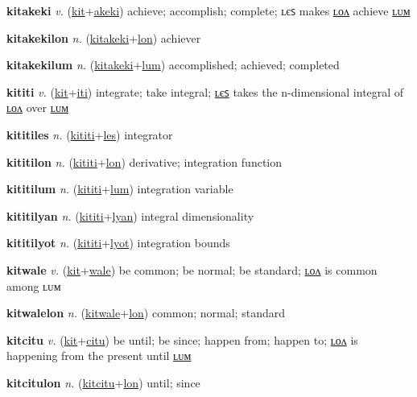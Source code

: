 \textbf{\hypertarget{kitakeki}{kitakeki}} \textit{v.} (\hyperlink{kit}{kit}+\allowbreak \hyperlink{akeki}{akeki})
achieve; accomplish; complete; ʟєꜱ makes \hyperlink{kitakekilon}{ʟᴏᴧ} achieve \hyperlink{kitakekilum}{ʟᴜᴍ}

\textbf{\hypertarget{kitakekilon}{kitakekilon}} \textit{n.} (\hyperlink{kitakeki}{kitakeki}+\allowbreak \hyperlink{lon}{lon})
achiever

\textbf{\hypertarget{kitakekilum}{kitakekilum}} \textit{n.} (\hyperlink{kitakeki}{kitakeki}+\allowbreak \hyperlink{lum}{lum})
accomplished; achieved; completed

\textbf{\hypertarget{kititi}{kititi}} \textit{v.} (\hyperlink{kit}{kit}+\allowbreak \hyperlink{iti}{iti})
integrate; take integral; \hyperlink{kititiles}{ʟєꜱ} takes the n-dimensional integral of \hyperlink{kititilon}{ʟᴏᴧ} over \hyperlink{kititilum}{ʟᴜᴍ}

\textbf{\hypertarget{kititiles}{kititiles}} \textit{n.} (\hyperlink{kititi}{kititi}+\allowbreak \hyperlink{les}{les})
integrator

\textbf{\hypertarget{kititilon}{kititilon}} \textit{n.} (\hyperlink{kititi}{kititi}+\allowbreak \hyperlink{lon}{lon})
derivative; integration function

\textbf{\hypertarget{kititilum}{kititilum}} \textit{n.} (\hyperlink{kititi}{kititi}+\allowbreak \hyperlink{lum}{lum})
integration variable

\textbf{\hypertarget{kititilyan}{kititilyan}} \textit{n.} (\hyperlink{kititi}{kititi}+\allowbreak \hyperlink{lyan}{lyan})
integral dimensionality

\textbf{\hypertarget{kititilyot}{kititilyot}} \textit{n.} (\hyperlink{kititi}{kititi}+\allowbreak \hyperlink{lyot}{lyot})
integration bounds

\textbf{\hypertarget{kitwale}{kitwale}} \textit{v.} (\hyperlink{kit}{kit}+\allowbreak \hyperlink{wale}{wale})
be common; be normal; be standard; \hyperlink{kitwalelon}{ʟᴏᴧ} is common among ʟᴜᴍ

\textbf{\hypertarget{kitwalelon}{kitwalelon}} \textit{n.} (\hyperlink{kitwale}{kitwale}+\allowbreak \hyperlink{lon}{lon})
common; normal; standard

\textbf{\hypertarget{kitcitu}{kitcitu}} \textit{v.} (\hyperlink{kit}{kit}+\allowbreak \hyperlink{citu}{citu})
be until; be since; happen from; happen to; \hyperlink{kitcitulon}{ʟᴏᴧ} is happening from the present until \hyperlink{kitcitulum}{ʟᴜᴍ}

\textbf{\hypertarget{kitcitulon}{kitcitulon}} \textit{n.} (\hyperlink{kitcitu}{kitcitu}+\allowbreak \hyperlink{lon}{lon})
until; since

